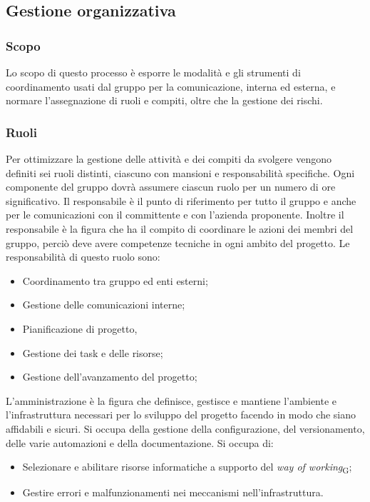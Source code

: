 \subsection{Gestione organizzativa}
\subsubsection{Scopo}
Lo scopo di questo processo è esporre le modalità e gli strumenti di coordinamento usati dal gruppo per la comunicazione, interna ed esterna, e normare l'assegnazione di ruoli e compiti, oltre che la gestione dei rischi.

\subsubsection{Ruoli}
Per ottimizzare la gestione delle attività e dei compiti da svolgere vengono definiti sei ruoli distinti, ciascuno con mansioni e responsabilità specifiche. Ogni componente del gruppo dovrà assumere ciascun ruolo per un numero di ore significativo.
Il responsabile è il punto di riferimento per tutto il gruppo e anche per le comunicazioni con il committente e con l'azienda proponente.
Inoltre il responsabile è la figura che ha il compito di coordinare le azioni dei membri del gruppo, perciò deve avere competenze tecniche in ogni ambito del progetto. Le responsabilità di questo ruolo sono:
\begin{itemize}
    \item Coordinamento tra gruppo ed enti esterni;
    \item Gestione delle comunicazioni interne;
    \item Pianificazione di progetto,
    \item Gestione dei task e delle risorse;
    \item Gestione dell'avanzamento del progetto;
\end{itemize}
L'amministrazione è la figura che definisce, gestisce e mantiene l’ambiente e l’infrastruttura necessari per lo
sviluppo del progetto facendo in modo che siano affidabili e sicuri. Si occupa della gestione della configurazione, del versionamento, delle varie automazioni e della documentazione. Si occupa di:
\begin{itemize}
    \item Selezionare e abilitare risorse informatiche a supporto del \textit{way of working}\textsubscript{G};
    \item Gestire errori e malfunzionamenti nei meccanismi nell’infrastruttura.
\end{itemize}

